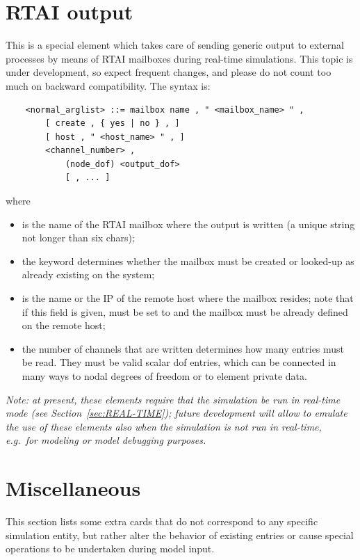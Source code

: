 \section{RTAI output}\label{sec:RTAI_out}
This is a special element which takes care of sending generic output
to external processes by means of RTAI mailboxes during real-time 
simulations.
This topic is under development, so expect frequent changes, and
please do not count too much on backward compatibility.
The syntax is:
\begin{verbatim}
    <normal_arglist> ::= mailbox name , " <mailbox_name> " ,
        [ create , { yes | no } , ]
        [ host , " <host_name> " , ]
        <channel_number> ,
            (node_dof) <output_dof>
            [ , ... ]
\end{verbatim}
where
\begin{itemize}
\item {} is the name of the RTAI mailbox where 
the output is written  (a unique string not longer than six chars);
\item the  keyword determines whether the mailbox
must be created or looked-up as already existing on the system;
\item {} is the name or the IP of the remote host where
the mailbox resides; note that if this field is given,  must
be set to  and the mailbox must be already defined
on the remote host;
\item the number of channels  that are written
determines how many  entries must be read.
They must be valid scalar dof entries, which can be connected
in many ways to nodal degrees of freedom or to element private data.
\end{itemize}

\emph{Note: at present, these elements require that the simulation
be run in real-time mode (see Section~\ref{sec:REAL-TIME});
future development will allow to emulate the use of these elements
also when the simulation is not run in real-time, e.g.\ for modeling
or model debugging purposes.}



\section{Miscellaneous}
This section lists some extra cards that do not correspond to any
specific simulation entity, but rather alter the behavior 
of existing entries or cause special operations to be undertaken
during model input.

